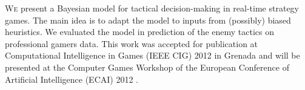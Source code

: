 



\lettrine{W}{e} present a Bayesian model for tactical decision-making in real-time strategy games. The main idea is to adapt the model to inputs from (possibly) biased heuristics. We evaluated the model in prediction of the enemy tactics on professional gamers data. This work was accepted for publication at Computational Intelligence in Games (IEEE CIG) 2012 in Grenada \citep{SYNNAEVE:Tactics} and will be presented at the Computer Games Workshop of the European Conference of Artificial Intelligence (ECAI) 2012 \citep{SYNNAEVE:TacticsECAI}.


